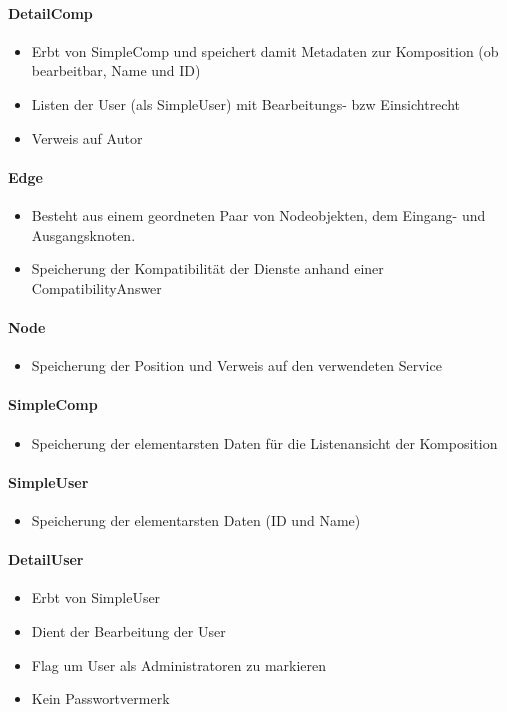 \paragraph{DetailComp}
\begin{itemize}
	\item Erbt von SimpleComp und speichert damit Metadaten zur Komposition (ob bearbeitbar, Name und ID)
	\item Listen der User (als SimpleUser) mit Bearbeitungs- bzw Einsichtrecht
	\item Verweis auf Autor
\end{itemize}
\paragraph{Edge}
\begin{itemize}
	\item Besteht aus einem geordneten Paar von Nodeobjekten, dem Eingang- und Ausgangsknoten.
	\item Speicherung der Kompatibilität der Dienste anhand einer CompatibilityAnswer
\end{itemize}
\paragraph{Node} 
\begin{itemize}
	\item Speicherung der Position und Verweis auf den verwendeten Service
\end{itemize}
\paragraph{SimpleComp}
\begin{itemize}
	\item Speicherung der elementarsten Daten für die Listenansicht der Komposition
\end{itemize}
\paragraph{SimpleUser}
\begin{itemize}
	\item Speicherung der elementarsten Daten (ID und Name)
\end{itemize}
\paragraph{DetailUser}
\begin{itemize}
	\item Erbt von SimpleUser
	\item Dient der Bearbeitung der User
	\item Flag um User als Administratoren zu markieren
	\item Kein Passwortvermerk
\end{itemize}
